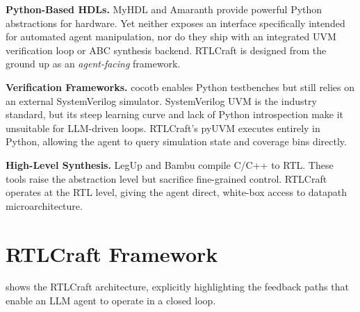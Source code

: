 \documentclass[11pt]{article}
\begin{document}
\textbf{Python-Based HDLs.} MyHDL\cite{myhdl} and Amaranth\cite{amaranth} provide powerful Python abstractions for hardware. Yet neither exposes an interface specifically intended for automated agent manipulation, nor do they ship with an integrated UVM verification loop or ABC synthesis backend. RTLCraft is designed from the ground up as an \textit{agent-facing} framework.

\textbf{Verification Frameworks.} cocotb\cite{cocotb} enables Python testbenches but still relies on an external SystemVerilog simulator. SystemVerilog UVM is the industry standard\cite{uvm}, but its steep learning curve and lack of Python introspection make it unsuitable for LLM-driven loops. RTLCraft's pyUVM executes entirely in Python, allowing the agent to query simulation state and coverage bins directly.

\textbf{High-Level Synthesis.} LegUp\cite{legup} and Bambu\cite{bambu} compile C/C++ to RTL. These tools raise the abstraction level but sacrifice fine-grained control. RTLCraft operates at the RTL level, giving the agent direct, white-box access to datapath microarchitecture.

\section{RTLCraft Framework}
\label{sec:framework}

 shows the RTLCraft architecture, explicitly highlighting the feedback paths that enable an LLM agent to operate in a closed loop.
\end{document}

